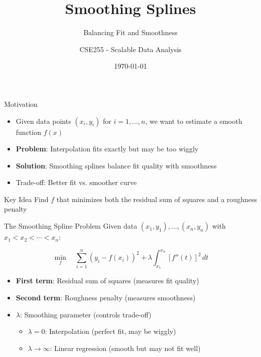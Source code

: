 \documentclass[aspectratio=169]{beamer}
\title{Smoothing Splines}
\subtitle{Balancing Fit and Smoothness}
\author{CSE255 - Scalable Data Analysis}
\date{\today}
\begin{document}
\frame{\titlepage}

\begin{frame}{Motivation}
\begin{itemize}
    \item Given data points $(x_i, y_i)$ for $i = 1, \ldots, n$, we want to estimate a smooth function $f(x)$
    \item \textbf{Problem}: Interpolation fits exactly but may be too wiggly
    \item \textbf{Solution}: Smoothing splines balance fit quality with smoothness
    \item Trade-off: Better fit vs. smoother curve
\end{itemize}

\begin{block}{Key Idea}
Find $f$ that minimizes both the residual sum of squares and a roughness penalty
\end{block}
\end{frame}

\begin{frame}{The Smoothing Spline Problem}
Given data $(x_1, y_1), \ldots, (x_n, y_n)$ with $x_1 < x_2 < \cdots < x_n$:

\[
\min_{f} \quad \sum_{i=1}^{n} (y_i - f(x_i))^2 + \lambda \int_{x_1}^{x_n} [f''(t)]^2 \, dt
\]

\begin{itemize}
    \item \textbf{First term}: Residual sum of squares (measures fit quality)
    \item \textbf{Second term}: Roughness penalty (measures smoothness)
    \item \textbf{$\lambda$}: Smoothing parameter (controls trade-off)
    \begin{itemize}
        \item $\lambda = 0$: Interpolation (perfect fit, may be wiggly)
        \item $\lambda \to \infty$: Linear regression (smooth but may not fit well)
    \end{itemize}
\end{itemize}
\end{frame}
\end{document}
